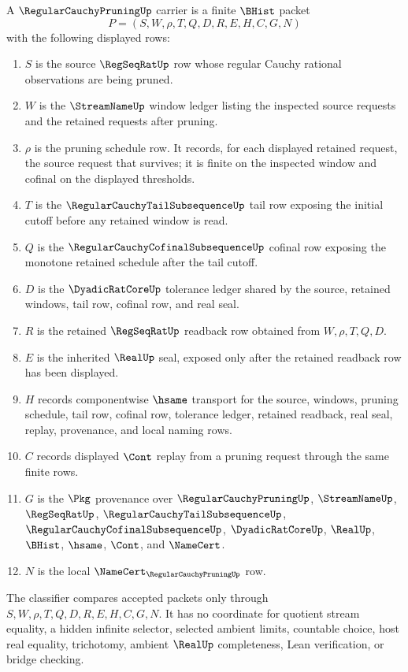 \begin{definition}
\label{def:regular-cauchy-pruning-carrier}
A $\RegularCauchyPruningUp$ carrier is a finite $\BHist$ packet
$$
P=(S,W,\rho,T,Q,D,R,E,H,C,G,N)
$$
with the following displayed rows:
\begin{enumerate}
\item $S$ is the source $\RegSeqRatUp$ row whose regular Cauchy rational observations are being pruned.
\item $W$ is the $\StreamNameUp$ window ledger listing the inspected source requests and the retained requests after pruning.
\item $\rho$ is the pruning schedule row. It records, for each displayed retained request, the source request that survives; it is finite on the inspected window and cofinal on the displayed thresholds.
\item $T$ is the $\RegularCauchyTailSubsequenceUp$ tail row exposing the initial cutoff before any retained window is read.
\item $Q$ is the $\RegularCauchyCofinalSubsequenceUp$ cofinal row exposing the monotone retained schedule after the tail cutoff.
\item $D$ is the $\DyadicRatCoreUp$ tolerance ledger shared by the source, retained windows, tail row, cofinal row, and real seal.
\item $R$ is the retained $\RegSeqRatUp$ readback row obtained from $W,\rho,T,Q,D$.
\item $E$ is the inherited $\RealUp$ seal, exposed only after the retained readback row has been displayed.
\item $H$ records componentwise $\hsame$ transport for the source, windows, pruning schedule, tail row, cofinal row, tolerance ledger, retained readback, real seal, replay, provenance, and local naming rows.
\item $C$ records displayed $\Cont$ replay from a pruning request through the same finite rows.
\item $G$ is the $\Pkg$ provenance over $\RegularCauchyPruningUp$, $\StreamNameUp$, $\RegSeqRatUp$, $\RegularCauchyTailSubsequenceUp$, $\RegularCauchyCofinalSubsequenceUp$, $\DyadicRatCoreUp$, $\RealUp$, $\BHist$, $\hsame$, $\Cont$, and $\NameCert$.
\item $N$ is the local $\NameCert_{\RegularCauchyPruningUp}$ row.
\end{enumerate}
The classifier compares accepted packets only through $S,W,\rho,T,Q,D,R,E,H,C,G,N$. It has no coordinate for quotient stream equality, a hidden infinite selector, selected ambient limits, countable choice, host real equality, trichotomy, ambient $\RealUp$ completeness, Lean verification, or bridge checking.
\end{definition}

